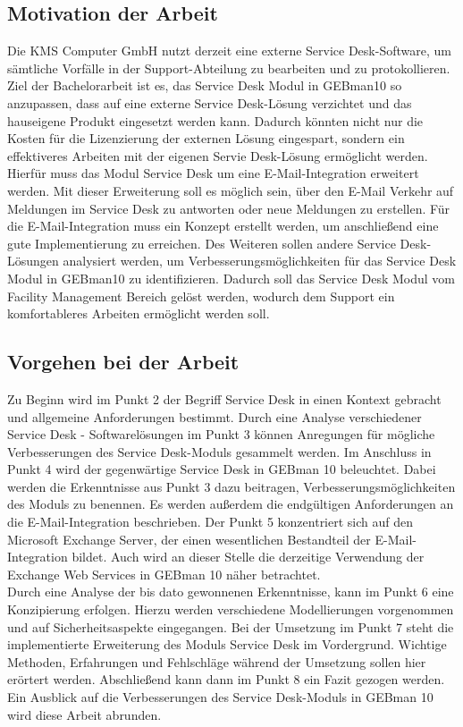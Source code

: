 \subsection{Motivation der Arbeit}
\noindent
Die KMS Computer GmbH nutzt derzeit eine externe Service Desk-Software, um sämtliche Vorfälle in der Support-Abteilung zu bearbeiten und zu protokollieren. Ziel der Bachelorarbeit ist es, das Service Desk Modul in GEBman10 so anzupassen, dass auf eine externe Service Desk-Lösung verzichtet und das hauseigene Produkt eingesetzt werden kann. Dadurch könnten nicht nur die Kosten für die Lizenzierung der externen Lösung eingespart, sondern ein effektiveres Arbeiten mit der eigenen Servie Desk-Lösung ermöglicht werden. Hierfür muss das Modul Service Desk um eine E-Mail-Integration erweitert werden. Mit dieser Erweiterung soll es möglich sein, über den E-Mail Verkehr auf Meldungen im Service Desk zu antworten oder neue Meldungen zu erstellen. Für die E-Mail-Integration muss ein Konzept erstellt werden, um anschließend eine gute Implementierung zu erreichen.\newline
Des Weiteren sollen andere Service Desk-Lösungen analysiert werden, um Verbesserungsmöglichkeiten für das Service Desk Modul in GEBman10 zu identifizieren. Dadurch soll das Service Desk Modul vom Facility Management Bereich gelöst werden, wodurch dem Support ein komfortableres Arbeiten ermöglicht werden soll.\\


\subsection{Vorgehen bei der Arbeit}
\noindent
Zu Beginn wird im Punkt 2 der Begriff Service Desk in einen Kontext gebracht und allgemeine Anforderungen bestimmt. Durch eine Analyse verschiedener Service Desk - Softwarelösungen im Punkt 3 können Anregungen für mögliche Verbesserungen des Service Desk-Moduls gesammelt werden. Im Anschluss in Punkt 4 wird der gegenwärtige Service Desk in GEBman 10 beleuchtet. Dabei werden die Erkenntnisse aus Punkt 3 dazu beitragen, Verbesserungsmöglichkeiten des Moduls zu benennen. Es werden außerdem die endgültigen Anforderungen an die E-Mail-Integration beschrieben. Der Punkt 5 konzentriert sich auf den Microsoft Exchange Server, der einen wesentlichen Bestandteil der E-Mail-Integration bildet. Auch wird an dieser Stelle die derzeitige Verwendung der Exchange Web Services in GEBman 10 näher betrachtet.\\

\noindent
Durch eine Analyse der bis dato gewonnenen Erkenntnisse, kann im Punkt 6 eine Konzipierung erfolgen. Hierzu werden verschiedene Modellierungen vorgenommen und auf Sicherheitsaspekte eingegangen. Bei der Umsetzung im Punkt 7 steht die implementierte Erweiterung des Moduls Service Desk im Vordergrund. Wichtige Methoden, Erfahrungen und Fehlschläge während der Umsetzung sollen hier erörtert werden. Abschließend kann dann im Punkt 8 ein Fazit gezogen werden. Ein Ausblick auf die Verbesserungen des Service Desk-Moduls in GEBman 10 wird diese Arbeit abrunden.